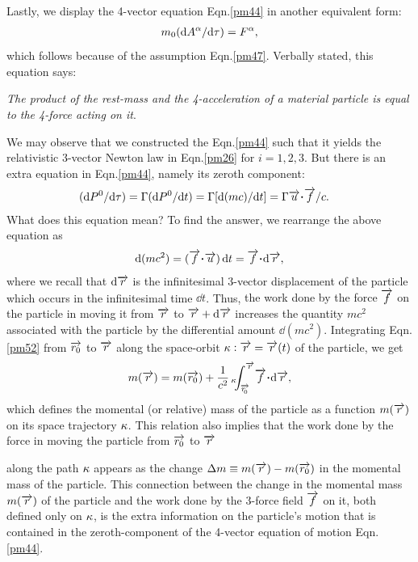Lastly, we display the 4-vector equation 
Eqn.\eqref{pm44} in
another  equivalent form:
\begin{align}\label{pmadd53}
m_0(\mathrm{d} A^{{\alpha}}/\mathrm{d} \tau)=F^{{\alpha}},
\end{align}
which follows because of the assumption 
Eqn.\eqref{pm47}.
Verbally  stated, this equation says:

\textsl{The product of the rest-mass and the 
4-acceleration 
of a  material particle is equal to the 4-force acting 
on 
it}.

We  may observe that we constructed the 
Eqn.\eqref{pm44} 
such that it yields the relativistic 3-vector Newton 
law in 
Eqn.\eqref{pm26} for $ i =1,2,3 $. But there is an 
extra 
equation in Eqn.\eqref{pm44}, namely its zeroth 
component:
\begin{align*}
(\dd P^0/\dd \tau) &=\Gamma (\dd P^0/\dd t)=\Gamma
[\dd (mc)/\dd t] =
\Gamma\veca{u}\dotp\veca{f}/c.
\end{align*}
What does this equation mean? To find the answer,  we 
rearrange the above equation as
\begin{align}\label{pm52}
 \dd (mc^2)=
(\veca{f}\dotp\veca{u})\,\dd t=\veca{f}\dotp 
\dd{\veca{r}},
\end{align}
where we recall that $\mathrm{d}{\overrightarrow{r}}$ is the 
infinitesimal 
3-vector displacement of the particle which occurs in 
the 
infinitesimal time $ \dd t $. Thus, {the work done by 
the 
force $\overrightarrow{f}$ on the particle in moving it from 
$\overrightarrow{r}$ 
to $\overrightarrow{r} +\mathrm{d} \overrightarrow{r}$ increases  the quantity $ 
mc^2$ 
associated with the particle by the differential amount 
$ 
\dd (mc^2)$}. Integrating Eqn.\eqref{pm52} from 
$\overrightarrow{r_0}$ 
to $\overrightarrow{r}$ along the space-orbit ${\kappa}: 
\overrightarrow{r}=\overrightarrow{r}(t)$ of the particle, we get
\begin{align}
m(\veca{r})=m(\veca{r_0})+\frac{1}{c^2}\,{}_{\gkk}
\hsn\int_{\veca{r_\sfx{0}}}^{\veca{r}}\nt \veca{f}\dotp
\dd{\veca{r}},
\end{align}
which defines the momental (or relative) mass of the 
particle as a function $  m(\overrightarrow{r})$ on its space 
trajectory ${\kappa}$. This relation also implies that the 
work 
done by the force in moving the particle from  
$\overrightarrow{r_0}$  
to $\overrightarrow{r}$ 
 
along the path  ${\kappa}$ appears as the change  $\Delta 
m\equiv m(\overrightarrow{r})-m(\overrightarrow{r_0})$ in the momental  
mass of 
the particle. This connection between the change in 
the 
momental mass $ m(\overrightarrow{r})$ of the particle and the 
work 
done by the 3-force field $\overrightarrow{f}$ on it, both 
defined only 
on  ${\kappa}$, is the extra information on the particle's 
motion that is contained in the zeroth-component of 
the 
4-vector equation of motion Eqn.\eqref{pm44}.

